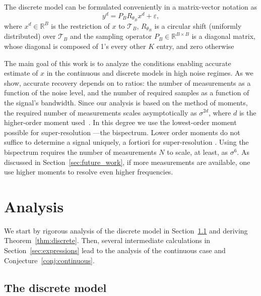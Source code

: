 \documentclass[english,12pt]{article}
\newcommand{\T}{\mathcal{T}}
\newcommand{\SR}{super-resolution }
\newcommand{\TODO}[1]{{\color{red}{[#1]}}}
\numberwithin{equation}{section}
\numberwithin{thm}{section} %
\begin{document}
The discrete model can be formulated conveniently in a matrix-vector notation as  
\begin{equation} \label{eq:discrete_model}
y^d = P_BR_{\theta_B} x^d + \varepsilon,
\end{equation}
where $x^d\in\mathbb{R}^{B}$ is the restriction of $x$ to $\T_B$, $R_{\theta_B}$ is a circular shift (uniformly distributed) over  $\T_B$ and the sampling operator $P_B\in\mathbb{R}^{B\times B}$ is a diagonal matrix, whose diagonal is composed of 1's every other $K$ entry, and zero otherwise

The main goal of this work is to analyze the conditions enabling accurate estimate of $x$ in the continuous and discrete models in high noise regimes. As we show, accurate recovery depends on to ratios: the number of measurements as a function of the noise level, and the number of required samples as a function of the signal's bandwidth. Since our analysis is based on the method of moments, the required number of measurements scales asymptotically as $\sigma^{2d}$, where $d$ is the higher-order moment used~\cite{abbe2018estimation,bandeira2017estimation}. 
In this degree we use the lowest-order moment possible for \SR---the bispectrum. Lower order moments do not suffice to determine a signal uniquely, a fortiori for \SR. Using the bispectrum requires the number of measurements $N$ to scale, at least, as $\sigma^6$. 
As discussed in Section~\ref{sec:future_work}, if more measurements are available, one use higher moments to resolve even higher frequencies. 
\TODO{I am using moments/invariants interchangeably}

\section{Analysis}

We start by rigorous analysis of the discrete model in Section~\ref{sec:discrete_analysis} and deriving Theorem~\ref{thm:discrete}. Then, several intermediate calculations in Section~\ref{sec:expressions}  lead to the analysis of the continuous case and Conjecture~\ref{conj:continuous}.

\subsection{The discrete model} \label{sec:discrete_analysis}
\end{document}
